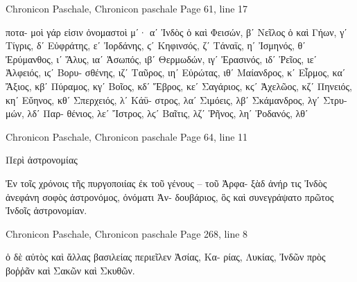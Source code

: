 \documentclass[12pt,letterpaper,twoside,final]{memoir}
\begin{document}
\begin{greek}
Chronicon Paschale, Chronicon paschale 
Page 61, line 17

                                                             ποτα-
μοὶ γάρ εἰσιν ὀνομαστοὶ μʹ· αʹ Ἰνδὸς ὁ καὶ Φεισών, βʹ Νεῖλος ὁ 
καὶ Γήων, γʹ Τίγρις, δʹ Εὐφράτης, εʹ Ἰορδάνης, ϛʹ Κηφινσός, 
ζʹ Τάναϊς, ηʹ Ἰσμηνός, θʹ Ἐρύμανθος, ιʹ Ἅλυς, ιαʹ Ἀσωπός, 
ιβʹ Θερμωδών, ιγʹ Ἐρασινός, ιδʹ Ῥεῖος, ιεʹ Ἀλφειός, ιϛʹ Βορυ-
σθένης, ιζʹ Ταῦρος, ιηʹ Εὐρώτας, ιθʹ Μαίανδρος, κʹ Εἶρμος,   
καʹ Ἄξιος, κβʹ Πύραμος, κγʹ Βοῖος, κδʹ Ἕβρος, κεʹ Σαγάριος, 
κϛʹ Ἀχελῶος, κζʹ Πηνειός, κηʹ Εὔηνος, κθʹ Σπερχειός, λʹ Κάϋ-
στρος, λαʹ Σιμόεις, λβʹ Σκάμανδρος, λγʹ Στρυμών, λδʹ Παρ-
θένιος, λεʹ Ἴστρος, λϛʹ Βαῖτις, λζʹ Ῥῆνος, ληʹ Ῥοδανός, λθʹ 




Chronicon Paschale, Chronicon paschale 
Page 64, line 11

Περὶ ἀστρονομίας


Ἐν τοῖς χρόνοις τῆς πυργοποιίας ἐκ τοῦ γένους – τοῦ Ἀρφα-
ξὰδ ἀνήρ τις Ἰνδὸς ἀνεφάνη σοφὸς ἀστρονόμος, ὀνόματι Ἀν-
δουβάριος, ὃς καὶ συνεγράψατο πρῶτος Ἰνδοῖς ἀστρονομίαν. 



Chronicon Paschale, Chronicon paschale 
Page 268, line 8

          ὁ δὲ αὐτὸς καὶ ἄλλας βασιλείας περιεῖλεν Ἀσίας, Κα-
ρίας, Λυκίας, Ἰνδῶν πρὸς βοῤῥᾶν καὶ Σακῶν καὶ Σκυθῶν. 

\end{greek}
\end{document}
